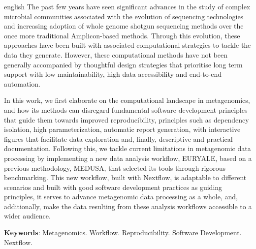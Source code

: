 \documentclass[
	12pt,				%
	oneside,			%
	a4paper,			%
	chapter=TITLE,		%
	section=TITLE,		%
	english,			%
	brazil				%
	]{abntex2}
\begin{document}
\begin{resumo}[Abstract]
	\SingleSpacing
	\begin{otherlanguage*}{english}
		The past few years have seen significant advances in the study of complex microbial communities associated with the evolution of sequencing technologies and increasing adoption of whole genome shotgun sequencing methods over the once more traditional Amplicon-based methods.
Through this evolution, these approaches have been built with associated computational strategies to tackle the data they generate. However,
these computational methods have not been generally accompanied by thoughtful design strategies that prioritise long term support with low maintainability, high data accessibility and end-to-end automation.

In this work, we first elaborate on the computational landscape in metagenomics, and how its methods can disregard fundamental software development principles that guide them towards improved reproducibility, principles such as dependency isolation, high parameterization, automatic report generation, with interactive figures that facilitate data exploration and, finally, descriptive and practical documentation. Following this, we tackle current limitations in metagenomic data processing by implementing a new data analysis workflow, EURYALE, based on a previous methodology, MEDUSA, that selected its tools through rigorous benchmarking. This new workflow, built with Nextflow, is adaptable to different scenarios and built with good software development practices as guiding principles, it serves to advance metagenomic data processing as a whole, and, additionally, make the data resulting from these analysis workflows accessible to a wider audience.

		\textbf{Keywords}:
	      Metagenomics.
        Workflow.
        Reproducibility.
        Software Development.
        Nextflow.
    	\end{otherlanguage*}
\end{resumo}
%
%
%
\end{document}

